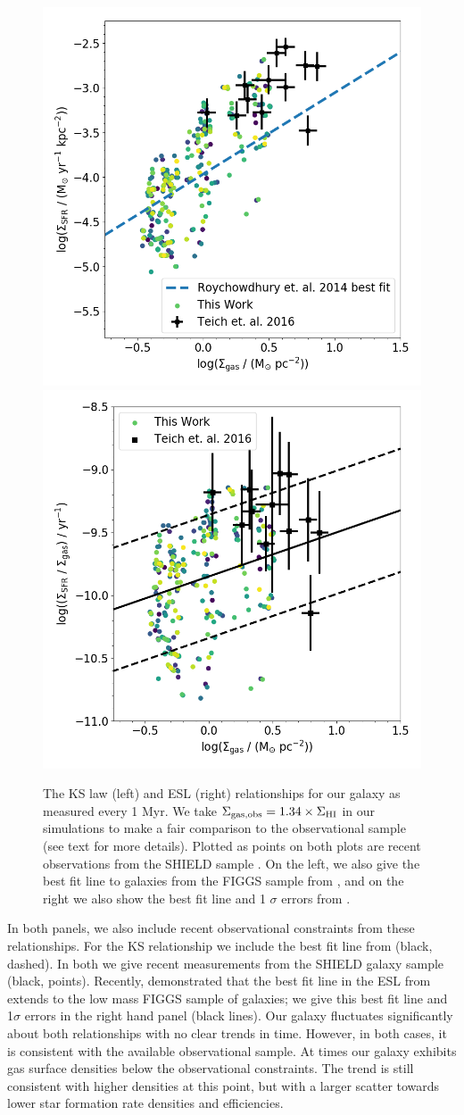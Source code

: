 \documentclass[twocolumn]{aastex61}
\begin{document}
\begin{figure}
\centering
\includegraphics[width=0.475\linewidth]{all_gas_schmidt_law_evolution}
\includegraphics[width=0.475\linewidth]{all_gass_efficiency_evolution}
\caption{The KS law (left) and ESL (right) relationships for our galaxy as measured every 1 Myr. We take $\Sigma_{\rm gas, obs} = 1.34 \times \Sigma_{\rm HI}$ in our simulations to make a fair comparison to the observational sample (see text for more details). Plotted as points on both plots are recent observations from the SHIELD sample \citep{Teich2016}. On the left, we also give the best fit line to galaxies from the FIGGS sample from \cite{Roychowdhury2014}, and on the right we also show the best fit line and 1 $\sigma$ errors from \cite{Shi2011}.}
\label{fig:KS}
\end{figure}

In both panels, we also include recent observational constraints from these relationships. For the KS relationship we include the best fit line from \citet{Roychowdhury2014} (black, dashed). In both we give recent measurements from the SHIELD galaxy sample \citep{Teich2016} (black, points). Recently, \cite{Roychowdhury2017} demonstrated that the best fit line in the ESL from \cite{Shi2011} extends to the low mass FIGGS sample of galaxies; we give this best fit line and 1$\sigma$ errors in the right hand panel (black lines). Our galaxy fluctuates significantly about both relationships with no clear trends in time. However, in both cases, it is consistent with the available observational sample. At times our galaxy exhibits gas surface densities below the observational constraints. The trend is still consistent with higher densities at this point, but with a larger scatter towards lower star formation rate densities and efficiencies.
\end{document}
